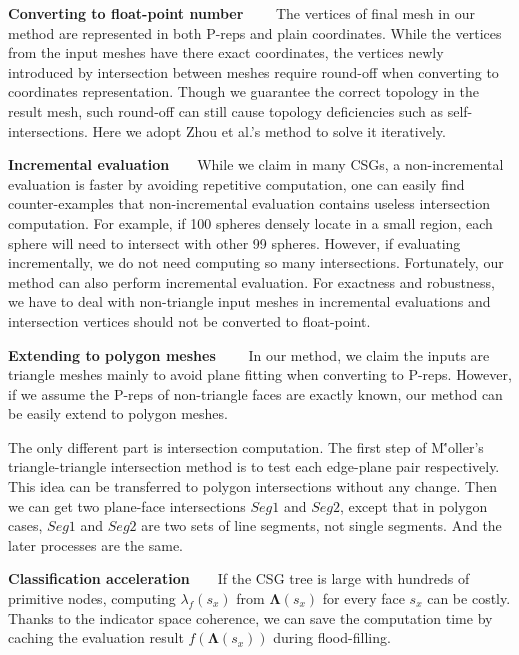 \documentclass[10pt,journal,compsoc]{IEEEtran}
\begin{document}
\vspace{0.5em}
\noindent\textbf{Converting to float-point number}~~~~
The vertices of final mesh in our method are represented in both P-reps and plain coordinates. While the vertices from the input meshes have there exact coordinates, the vertices newly introduced by intersection between meshes require round-off when converting to coordinates representation. Though we guarantee the correct topology in the result mesh, such round-off can still cause topology deficiencies such as self-intersections. Here we adopt Zhou et al.'s method \cite{zhou2016mesh} to solve it iteratively.

\vspace{0.5em}
\noindent\textbf{Incremental evaluation}~~~~While we claim in many CSGs, a non-incremental evaluation is faster by avoiding repetitive computation, one can easily find counter-examples that non-incremental evaluation contains useless intersection computation. For example, if 100 spheres densely locate in a small region, each sphere will need to intersect with other 99 spheres. However, if evaluating incrementally, we do not need computing so many intersections. Fortunately, our method can also perform incremental evaluation. For exactness and robustness, we have to deal with non-triangle input meshes in incremental evaluations and intersection vertices should not be converted to float-point.


\vspace{0.5em}
\noindent\textbf{Extending to polygon meshes}~~~~
In our method, we claim the inputs are triangle meshes mainly to avoid plane fitting when converting to P-reps. However, if we assume the P-reps of non-triangle faces are exactly known, our method can be easily extend to polygon meshes.


\vspace{0.5em}\noindent The only different part is intersection computation. The first step of M\''{o}ller's triangle-triangle intersection method is to test each edge-plane pair respectively. This idea can be transferred to polygon intersections without any change. Then we can get two plane-face intersections $Seg1$ and $Seg2$, except that in polygon cases, $Seg1$ and $Seg2$ are two sets of line segments, not single segments. And the later processes are the same.


\vspace{0.5em}
\noindent\textbf{Classification acceleration}~~~~If the CSG tree is large with hundreds of primitive nodes, computing $\lambda_f(s_x)$ from $\boldsymbol{\Lambda}(s_x)$ for every face $s_x$ can be costly. Thanks to the indicator space coherence, we can save the computation time by caching the evaluation result $f(\boldsymbol{\Lambda}(s_x))$ during flood-filling.
\end{document}
